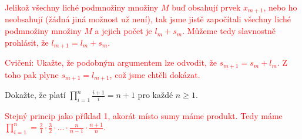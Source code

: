 \documentclass[10pt]{article}
\begin{document}
\begin{problem}
\vspace{5pt}
\noindent
\textcolor{red}{Jelikož všechny liché podmnožiny množiny $M$ buď obsahují prvek $x_{m+1}$, nebo ho neobsahují (žádná jiná možnost už není), tak jsme jistě započítali všechny liché podmnožiny množiny $M$ a jejich počet je $l_m + s_m$. Můžeme tedy slavnostně prohlásit, že $l_{m+1} = l_m + s_m$.}

\vspace{5pt}
\noindent
\textcolor{red}{Cvičení: Ukažte, že podobným argumentem lze odvodit, že $s_{m+1} = s_m + l_m$. Z toho pak plyne $s_{m+1} = l_{m+1}$, což jsme chtěli dokázat.}

\vspace{5pt}
\noindent
\textcolor{red}{}

\end{problem}

\begin{problem}
Dokažte, že platí $\prod_{i=1}^{n}\frac{i+1}{i} = n + 1$ pro každé $n \geq 1$.

\vspace{5pt}
\noindent
\textcolor{red}{Stejný princip jako příklad 1, akorát místo sumy máme produkt. Tedy máme $\prod_{i=1}^{n} = \frac{2}{1} \cdot \frac{3}{2} \cdot \ldots \cdot \frac{n}{n-1} \cdot \frac{n+1}{n}$.}
\end{problem}
\end{document}
